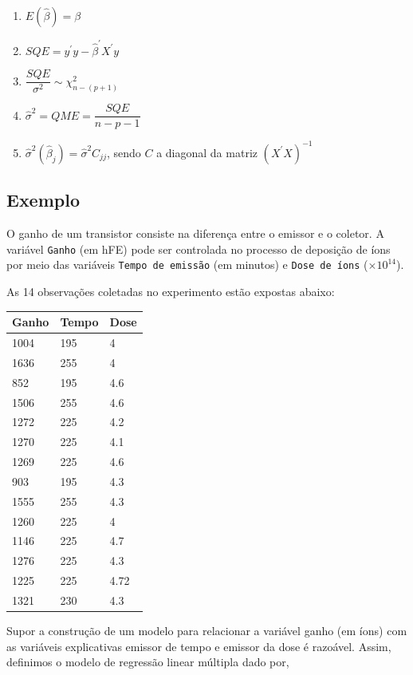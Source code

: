 \documentclass[
]{book}
\providecommand{\tightlist}{%
  \setlength{\itemsep}{0pt}\setlength{\parskip}{0pt}}
\begin{document}
\begin{enumerate}
\def\labelenumi{(\roman{enumi})}
\tightlist
\item
  \(E(\widehat{\beta})=\beta\)
\item
  \(SQE = y^\prime y-\widehat{\beta}^\prime X^\prime y\)
\item
  \(\dfrac{SQE}{\sigma^2}\sim\chi^{2}_{n-(p+1)}\)
\item
  \(\widehat{\sigma}^2=QME=\dfrac{SQE}{n-p-1}\)
\item
  \(\widehat{\sigma}^{2}(\widehat{\beta}_j)=\widehat{\sigma}^2C_{jj}\), sendo \(C\) a diagonal da matriz \({(X^\prime X)}^{-1}\)
\end{enumerate}

\hypertarget{exemplo-20}{%
\subsection{Exemplo}\label{exemplo-20}}

O ganho de um transistor consiste na diferença entre o emissor e o coletor. A variável \texttt{Ganho} (em hFE) pode ser controlada no processo de deposição de íons por meio das variáveis \texttt{Tempo de emissão} (em minutos) e \texttt{Dose de íons} (\(\times 10^{14}\)).

As 14 observações coletadas no experimento estão expostas abaixo:

\begin{longtable}[]{@{}lll@{}}
\toprule
Ganho & Tempo & Dose \\
\midrule
\endhead
1004 & 195 & 4 \\
1636 & 255 & 4 \\
852 & 195 & 4.6 \\
1506 & 255 & 4.6 \\
1272 & 225 & 4.2 \\
1270 & 225 & 4.1 \\
1269 & 225 & 4.6 \\
903 & 195 & 4.3 \\
1555 & 255 & 4.3 \\
1260 & 225 & 4 \\
1146 & 225 & 4.7 \\
1276 & 225 & 4.3 \\
1225 & 225 & 4.72 \\
1321 & 230 & 4.3 \\
\bottomrule
\end{longtable}

Supor a construção de um modelo para relacionar a variável ganho (em íons) com as variáveis explicativas emissor de tempo e emissor da dose é razoável. Assim, definimos o modelo de regressão linear múltipla dado por,
\end{document}
